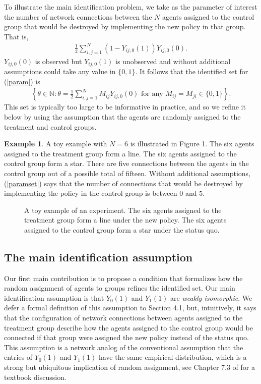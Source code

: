 \documentclass[12pt]{article}
\theoremstyle{definition}
\newtheorem{myexp}{Example}
\begin{document}
To illustrate the main identification problem, we take as the parameter of interest the number of network connections between the $N$ agents assigned to the control group that would be destroyed by implementing the new policy in that group. That is, 
\begin{align}\label{param}
\frac{1}{2}\sum_{i,j = 1}^{N}(1-Y_{ij,0}(1))Y_{ij,0}(0). 
\end{align}
$Y_{ij,0}(0)$ is observed but $Y_{ij,0}(1)$ is unobserved and  without additional assumptions could take any value in $\{0,1\}$. It follows that the identified set for (\ref{param}) is 
\begin{align}\label{paramset}
\left\{\theta \in \mathbb{N} : \theta = \frac{1}{2}\sum_{i,j = 1}^{N}M_{ij}Y_{ij,0}(0) \text{ for any } M_{ij} = M_{ji} \in \{0,1\}\right\}.
\end{align}
This set is typically too large to be informative in practice, and so we refine it below by using the assumption that the agents are randomly assigned to the treatment and control groups.    

\begin{myexp}
A toy example with $N = 6$ is illustrated in Figure 1. The six agents assigned to the treatment group form a line. The six agents assigned to the control group form a star.  There are five connections between the agents in the control group out of a possible total of fifteen. Without additional assumptions,  (\ref{paramset}) says that the number of connections that would be destroyed by implementing the policy in the control group is between $0$ and $5$.   
\end{myexp}

\begin{figure}
\centering

\vspace{-6mm}
\caption{A toy example of an experiment. The six agents assigned to the treatment group form a line under the new policy. The six agents assigned to the control group form a star under the status quo.}
\label{fig:toyexample_problem}
\end{figure}

\subsection{The main identification assumption}
Our first main contribution is to propose a condition that formalizes how the random assignment of agents to groups refines the identified set. Our main identification assumption is that $Y_{0}(1)$ and $Y_{1}(1)$ are \emph{weakly isomorphic}. We defer a formal definition of this assumption to Section 4.1, but, intuitively, it says that the configuration of network connections between agents assigned to the treatment group describe how the agents assigned to the control group would be connected if that group were assigned the new policy instead of the status quo. This assumption is a network analog of the conventional assumption that the entries of $Y_{0}(1)$ and $Y_{1}(1)$ have the same empirical distribution, which is a strong but ubiquitous implication of random assignment, see Chapter 7.3 of \cite{manski2009identification} for a textbook discussion. 
\end{document}

